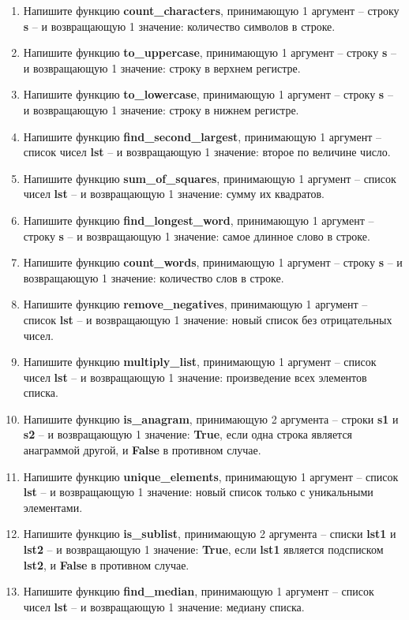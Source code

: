 \documentclass[a4,12pt]{article}
\theoremstyle{remark}
\begin{document}
\begin{enumerate}
    \item Напишите функцию \textbf{count\_characters}, принимающую 1 аргумент – строку \textbf{s} – и возвращающую 1 значение: количество символов в строке.
    \item Напишите функцию \textbf{to\_uppercase}, принимающую 1 аргумент – строку \textbf{s} – и возвращающую 1 значение: строку в верхнем регистре.
    \item Напишите функцию \textbf{to\_lowercase}, принимающую 1 аргумент – строку \textbf{s} – и возвращающую 1 значение: строку в нижнем регистре.
    \item Напишите функцию \textbf{find\_second\_largest}, принимающую 1 аргумент – список чисел \textbf{lst} – и возвращающую 1 значение: второе по величине число.
    \item Напишите функцию \textbf{sum\_of\_squares}, принимающую 1 аргумент – список чисел \textbf{lst} – и возвращающую 1 значение: сумму их квадратов.
    \item Напишите функцию \textbf{find\_longest\_word}, принимающую 1 аргумент – строку \textbf{s} – и возвращающую 1 значение: самое длинное слово в строке.
    \item Напишите функцию \textbf{count\_words}, принимающую 1 аргумент – строку \textbf{s} – и возвращающую 1 значение: количество слов в строке.
    \item Напишите функцию \textbf{remove\_negatives}, принимающую 1 аргумент – список \textbf{lst} – и возвращающую 1 значение: новый список без отрицательных чисел.
    \item Напишите функцию \textbf{multiply\_list}, принимающую 1 аргумент – список чисел \textbf{lst} – и возвращающую 1 значение: произведение всех элементов списка.
    \item Напишите функцию \textbf{is\_anagram}, принимающую 2 аргумента – строки \textbf{s1} и \textbf{s2} – и возвращающую 1 значение: \textbf{True}, если одна строка является анаграммой другой, и \textbf{False} в противном случае.
    \item Напишите функцию \textbf{unique\_elements}, принимающую 1 аргумент – список \textbf{lst} – и возвращающую 1 значение: новый список только с уникальными элементами.
    \item Напишите функцию \textbf{is\_sublist}, принимающую 2 аргумента – списки \textbf{lst1} и \textbf{lst2} – и возвращающую 1 значение: \textbf{True}, если \textbf{lst1} является подсписком \textbf{lst2}, и \textbf{False} в противном случае.
    \item Напишите функцию \textbf{find\_median}, принимающую 1 аргумент – список чисел \textbf{lst} – и возвращающую 1 значение: медиану списка.

\end{enumerate}
\end{document}
